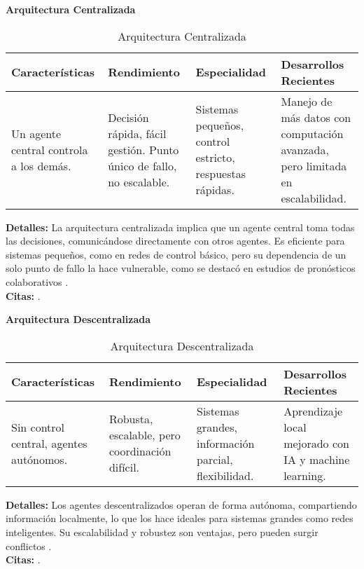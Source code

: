 	\textbf{Arquitectura Centralizada}
	\begin{table}[h!]
		\centering
		\begin{tabular}{|p{4cm}|p{4cm}|p{4cm}|p{4cm}|}
			\hline
			\textbf{Características} & \textbf{Rendimiento} & \textbf{Especialidad} & \textbf{Desarrollos Recientes} \\
			\hline
			Un agente central controla a los demás. & Decisión rápida, fácil gestión. Punto único de fallo, no escalable. & Sistemas pequeños, control estricto, respuestas rápidas. & Manejo de más datos con computación avanzada, pero limitada en escalabilidad. \\
			\hline
		\end{tabular}
		\caption{Arquitectura Centralizada}
	\end{table}
	\textbf{Detalles:} La arquitectura centralizada implica que un agente central toma todas las decisiones, comunicándose directamente con otros agentes. Es eficiente para sistemas pequeños, como en redes de control básico, pero su dependencia de un solo punto de fallo la hace vulnerable, como se destacó en estudios de pronósticos colaborativos \citep{palau2019multi}.\\
	\textbf{Citas:} \citep{palau2019multi, goodai2022centralized}.
	
	\textbf{Arquitectura Descentralizada}
	\begin{table}[h!]
		\centering
		\begin{tabular}{|p{4cm}|p{4cm}|p{4cm}|p{4cm}|}
			\hline
			\textbf{Características} & \textbf{Rendimiento} & \textbf{Especialidad} & \textbf{Desarrollos Recientes} \\
			\hline
			Sin control central, agentes autónomos. & Robusta, escalable, pero coordinación difícil. & Sistemas grandes, información parcial, flexibilidad. & Aprendizaje local mejorado con IA y machine learning. \\
			\hline
		\end{tabular}
		\caption{Arquitectura Descentralizada}
	\end{table}
	\textbf{Detalles:} Los agentes descentralizados operan de forma autónoma, compartiendo información localmente, lo que los hace ideales para sistemas grandes como redes inteligentes. Su escalabilidad y robustez son ventajas, pero pueden surgir conflictos \citep{geeksforgeeks2018comparison}.\\
	\textbf{Citas:} \citep{palau2019multi, geeksforgeeks2018comparison, goodai2022centralized}.
	
